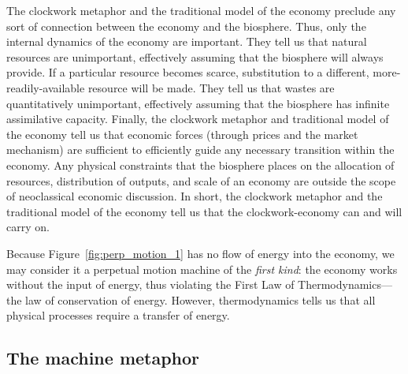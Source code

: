The clockwork metaphor and the traditional model of the economy
preclude any sort of connection 
between the economy and the biosphere.
Thus, only the internal dynamics of the economy are important. 
They tell us that natural resources are unimportant, 
effectively assuming that the biosphere will always provide.
If a particular resource becomes scarce, 
substitution to a different, more-readily-available resource will be made.
They tell us that wastes are quantitatively unimportant, 
effectively assuming that the biosphere has infinite assimilative capacity.
Finally, the clockwork metaphor and traditional model of the economy 
tell us that economic forces 
(through prices and the market mechanism) 
are sufficient to efficiently guide any necessary transition
within the economy.
Any physical constraints that the biosphere places on 
the allocation of resources, distribution of outputs, and 
scale of an economy 
are outside the scope of neoclassical economic discussion.\cite{Daly1995}
In short, the clockwork metaphor and the traditional model of the economy 
tell us that the clockwork-economy can and will carry on.

Because Figure~\ref{fig:perp_motion_1} has no flow of energy
into the economy,
we may consider it a perpetual motion machine
of the \emph{first kind}:
the economy works without the input of energy, thus violating
the First Law of Thermodynamics---the 
law of conservation of energy.\cite{Rao2004}
However, thermodynamics tells us that all physical processes 
require a transfer of energy.


\subsection{The machine metaphor}
\label{sec:machine_metaphor}



